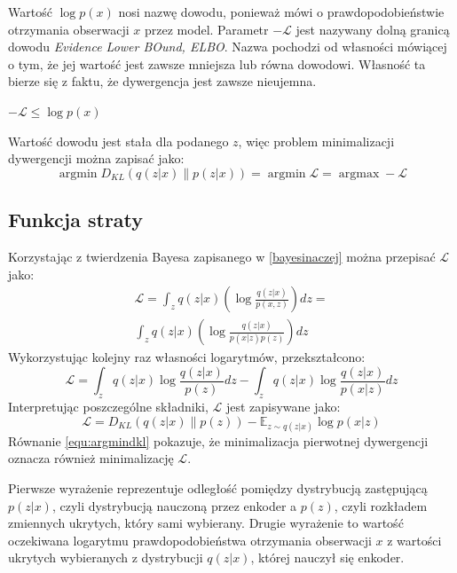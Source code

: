 \documentclass[a4paper,12pt,oneside]{book} %
\begin{document}
Wartość $\log p(x)$ nosi nazwę dowodu, ponieważ mówi o prawdopodobieństwie otrzymania obserwacji $x$ przez model.
Parametr $-\mathcal{L}$ jest nazywany dolną granicą dowodu \textit{Evidence Lower BOund, ELBO}. Nazwa pochodzi od własności mówiącej o tym, że jej wartość jest zawsze mniejsza lub równa dowodowi. Własność ta bierze się z faktu, że dywergencja jest zawsze nieujemna.
\begin{center}
	$-\mathcal{L}\leq\log p(x)$
\end{center}
Wartość dowodu jest stała dla podanego $z$, więc problem minimalizacji dywergencji można zapisać jako:
\begin{equation}
	\operatorname*{argmin}D_{KL}(q(z|x)\|p(z|x)) = \operatorname*{argmin}\mathcal{L} = \operatorname*{argmax}-\mathcal{L}
	\label{equ:argmindkl}
\end{equation}
\subsection{Funkcja straty}
Korzystając z twierdzenia Bayesa zapisanego w \ref{bayesinaczej} można przepisać $\mathcal{L}$ jako:
\begin{equation}
	\begin{aligned}
		\mathcal{L}=\displaystyle\int_{z}^{}q(z|x)\left( \log\frac{q(z|x)}{p(x,z)}\right)dz=\\[1ex]
		\displaystyle\int_{z}^{}q(z|x)\left( \log\frac{q(z|x)}{p(x|z)p(z)}\right)dz
		\label{equ:kldlogagn}
	\end{aligned}
\end{equation}
Wykorzystując kolejny raz własności logarytmów, przekształcono:
\begin{equation}
	\mathcal{L}=\displaystyle\int_{z}^{}q(z|x)\log\frac{q(z|x)}{p(z)}dz - \displaystyle\int_{z}^{}q(z|x)\log\frac{q(z|x)}{p(x|z)}dz
	\label{equ:elbolog}
\end{equation}
Interpretując poszczególne składniki, $\mathcal{L}$ jest zapisywane jako:
\begin{equation}
	\mathcal{L} =  D_{KL}(q(z|x)\|p(z)) - \mathbb{E}_{z\sim q(z|x)}\log p(x|z)
	\label{equ:ostatniejuz}
\end{equation}
Równanie \ref{equ:argmindkl} pokazuje, że minimalizacja pierwotnej dywergencji oznacza również minimalizację $\mathcal{L}$. 

Pierwsze wyrażenie reprezentuje odległość pomiędzy dystrybucją zastępującą $p(z|x)$, czyli dystrybucją nauczoną przez enkoder a $p(z)$, czyli rozkładem zmiennych ukrytych, który sami wybierany. Drugie wyrażenie to wartość oczekiwana logarytmu prawdopodobieństwa otrzymania obserwacji $x$ z wartości ukrytych wybieranych z dystrybucji $q(z|x)$, której nauczył się enkoder.
\end{document}
